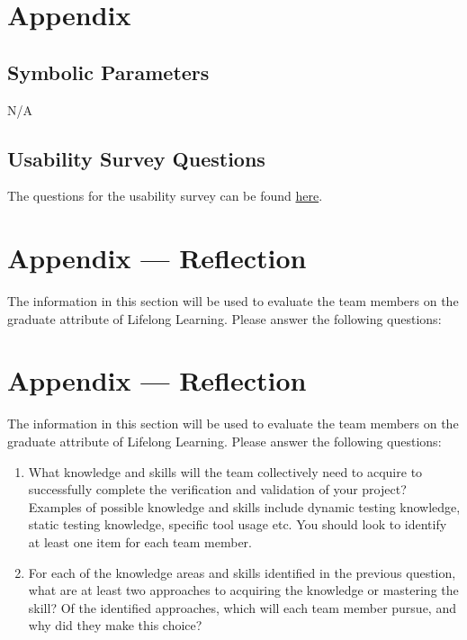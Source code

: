 \documentclass[12pt, titlepage]{article}
\begin{document}


\newpage

\section{Appendix}

\subsection{Symbolic Parameters}

N/A

\subsection{Usability Survey Questions}

The questions for the usability survey can be found \href{https://docs.google.com/forms/d/e/1FAIpQLSeHQbMiXtfpNlbR3EWfvaZtoYHO0kur1HRKV1nBb5CGQUYkUQ/viewform}{here}.

\newpage{}
\section*{Appendix --- Reflection}

The information in this section will be used to evaluate the team members on the
graduate attribute of Lifelong Learning.  Please answer the following questions:

\newpage{}
\section*{Appendix --- Reflection}


The information in this section will be used to evaluate the team members on the
graduate attribute of Lifelong Learning.  Please answer the following questions:

\begin{enumerate}
  \item What knowledge and skills will the team collectively need to acquire to
  successfully complete the verification and validation of your project?
  Examples of possible knowledge and skills include dynamic testing knowledge,
  static testing knowledge, specific tool usage etc.  You should look to
  identify at least one item for each team member.
  \item For each of the knowledge areas and skills identified in the previous
  question, what are at least two approaches to acquiring the knowledge or
  mastering the skill?  Of the identified approaches, which will each team
  member pursue, and why did they make this choice?
\end{enumerate}
\end{document}
